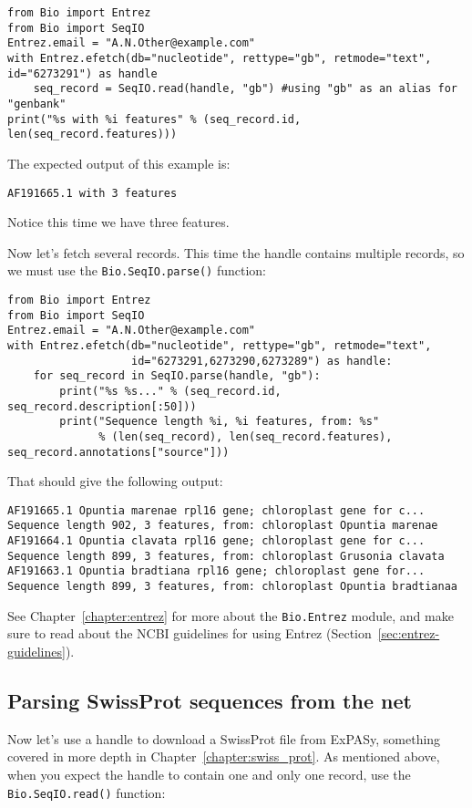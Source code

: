 \begin{verbatim}
from Bio import Entrez
from Bio import SeqIO
Entrez.email = "A.N.Other@example.com"
with Entrez.efetch(db="nucleotide", rettype="gb", retmode="text", id="6273291") as handle
    seq_record = SeqIO.read(handle, "gb") #using "gb" as an alias for "genbank"
print("%s with %i features" % (seq_record.id, len(seq_record.features)))
\end{verbatim}

\noindent The expected output of this example is:

\begin{verbatim}
AF191665.1 with 3 features
\end{verbatim}

\noindent Notice this time we have three features.

Now let's fetch several records.  This time the handle contains multiple records,
so we must use the \verb|Bio.SeqIO.parse()| function:

\begin{verbatim}
from Bio import Entrez
from Bio import SeqIO
Entrez.email = "A.N.Other@example.com"
with Entrez.efetch(db="nucleotide", rettype="gb", retmode="text",
                   id="6273291,6273290,6273289") as handle:
    for seq_record in SeqIO.parse(handle, "gb"):
        print("%s %s..." % (seq_record.id, seq_record.description[:50]))
        print("Sequence length %i, %i features, from: %s"
              % (len(seq_record), len(seq_record.features), seq_record.annotations["source"]))
\end{verbatim}

\noindent That should give the following output:

\begin{verbatim}
AF191665.1 Opuntia marenae rpl16 gene; chloroplast gene for c...
Sequence length 902, 3 features, from: chloroplast Opuntia marenae
AF191664.1 Opuntia clavata rpl16 gene; chloroplast gene for c...
Sequence length 899, 3 features, from: chloroplast Grusonia clavata
AF191663.1 Opuntia bradtiana rpl16 gene; chloroplast gene for...
Sequence length 899, 3 features, from: chloroplast Opuntia bradtianaa
\end{verbatim}

See Chapter~\ref{chapter:entrez} for more about the \verb|Bio.Entrez| module, and make sure to read about the NCBI guidelines for using Entrez (Section~\ref{sec:entrez-guidelines}).

\subsection{Parsing SwissProt sequences from the net}
\label{sec:SeqIO_ExPASy_and_SwissProt}
Now let's use a handle to download a SwissProt file from ExPASy,
something covered in more depth in Chapter~\ref{chapter:swiss_prot}.
As mentioned above, when you expect the handle to contain one and only one record,
use the \verb|Bio.SeqIO.read()| function:

